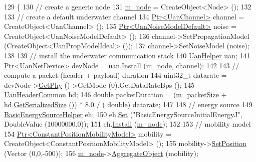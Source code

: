 \begin{DoxyCode}
129 \{
130   \textcolor{comment}{// create a generic node}
131   \hyperlink{classAcousticModemEnergyTestCase_a70215894f46e0f4c11d7adb48fce7d44}{m\_node} = CreateObject<Node> ();
132 
133   \textcolor{comment}{// create a default underwater channel}
134   \hyperlink{classns3_1_1Ptr}{Ptr<UanChannel>} channel = CreateObject<UanChannel> ();
135   \hyperlink{classns3_1_1Ptr}{Ptr<UanNoiseModelDefault>} noise = CreateObject<UanNoiseModelDefault> ();
136   channel->SetPropagationModel (CreateObject<UanPropModelIdeal> ());
137   channel->SetNoiseModel (noise);
138 
139   \textcolor{comment}{// install the underwater communication stack}
140   \hyperlink{classns3_1_1UanHelper}{UanHelper} uan;
141   \hyperlink{classns3_1_1Ptr}{Ptr<UanNetDevice>} devNode = uan.\hyperlink{classns3_1_1UanHelper_a283475798bb2df2ff11c53b68d2f1361}{Install} (\hyperlink{classAcousticModemEnergyTestCase_a70215894f46e0f4c11d7adb48fce7d44}{m\_node}, channel);
142 
143   \textcolor{comment}{// compute a packet (header + payload) duration}
144   uint32\_t datarate = devNode->\hyperlink{classns3_1_1UanNetDevice_abff3efdff8f4c31c2bb0ea780a6b99a8}{GetPhy} ()->GetMode (0).GetDataRateBps ();
145   \hyperlink{classns3_1_1UanHeaderCommon}{UanHeaderCommon} hd;
146   \textcolor{keywordtype}{double} packetDuration = (\hyperlink{classAcousticModemEnergyTestCase_aad81603d0836ba952c5633e44e72dce8}{m\_packetSize} + hd.\hyperlink{classns3_1_1UanHeaderCommon_afb5ab80bb39e33b3736d64165e19abf8}{GetSerializedSize} ()) * 8.0 / (\textcolor{keywordtype}{
      double}) datarate;
147 
148   \textcolor{comment}{// energy source}
149   \hyperlink{classns3_1_1BasicEnergySourceHelper}{BasicEnergySourceHelper} eh;
150   eh.\hyperlink{classns3_1_1BasicEnergySourceHelper_aa07c8c1c4a4ced92b8fc51bf4be4de3f}{Set} (\textcolor{stringliteral}{"BasicEnergySourceInitialEnergyJ"}, DoubleValue (10000000.0));
151   eh.\hyperlink{classns3_1_1EnergySourceHelper_ac52e48ef79c83537cc0bba02df8d91a1}{Install} (\hyperlink{classAcousticModemEnergyTestCase_a70215894f46e0f4c11d7adb48fce7d44}{m\_node});
152 
153   \textcolor{comment}{// mobility model}
154   \hyperlink{classns3_1_1Ptr}{Ptr<ConstantPositionMobilityModel>} mobility = 
      CreateObject<ConstantPositionMobilityModel> ();
155   mobility->\hyperlink{classns3_1_1MobilityModel_ac584b3d5a309709d2f13ed6ada1e7640}{SetPosition} (Vector (0,0,-500));
156   \hyperlink{classAcousticModemEnergyTestCase_a70215894f46e0f4c11d7adb48fce7d44}{m\_node}->\hyperlink{classns3_1_1Object_a79dd435d300f3deca814553f561a2922}{AggregateObject} (mobility);

\end{DoxyCode}
